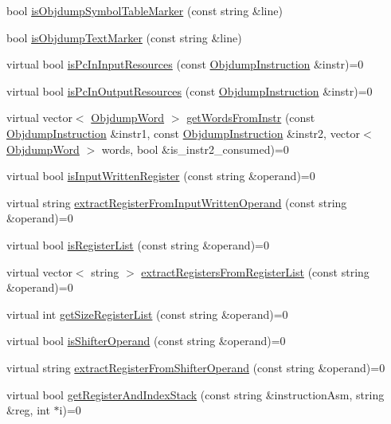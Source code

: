\begin{DoxyCompactItemize}
\item 
bool \hyperlink{classArch__dep_ae888c716d93a4d70216826f31997a0b1}{is\+Objdump\+Symbol\+Table\+Marker} (const string \&line)
\item 
bool \hyperlink{classArch__dep_ae6672e820c8f1210a9ce6cfa51432560}{is\+Objdump\+Text\+Marker} (const string \&line)
\item 
virtual bool \hyperlink{classArch__dep_ac6456dfba496bcf104d460c8610a484f}{is\+Pc\+In\+Input\+Resources} (const \hyperlink{classObjdumpInstruction}{Objdump\+Instruction} \&instr)=0
\item 
virtual bool \hyperlink{classArch__dep_a89b89f3e5248442dda296986f5673bb6}{is\+Pc\+In\+Output\+Resources} (const \hyperlink{classObjdumpInstruction}{Objdump\+Instruction} \&instr)=0
\item 
virtual vector$<$ \hyperlink{classObjdumpWord}{Objdump\+Word} $>$ \hyperlink{classArch__dep_a00e2fabd6cc0f5b9c36593a67f793d7a}{get\+Words\+From\+Instr} (const \hyperlink{classObjdumpInstruction}{Objdump\+Instruction} \&instr1, const \hyperlink{classObjdumpInstruction}{Objdump\+Instruction} \&instr2, vector$<$ \hyperlink{classObjdumpWord}{Objdump\+Word} $>$ words, bool \&is\+\_\+instr2\+\_\+consumed)=0
\item 
virtual bool \hyperlink{classArch__dep_a3d926dc01afb4aebf1136dbe0962a30d}{is\+Input\+Written\+Register} (const string \&operand)=0
\item 
virtual string \hyperlink{classArch__dep_a286da739265c852e98f2efd622615b96}{extract\+Register\+From\+Input\+Written\+Operand} (const string \&operand)=0
\item 
virtual bool \hyperlink{classArch__dep_a6c37096e67b2c02e9c0bd38313245979}{is\+Register\+List} (const string \&operand)=0
\item 
virtual vector$<$ string $>$ \hyperlink{classArch__dep_afac73b40e179fbab3fc0954aa060548f}{extract\+Registers\+From\+Register\+List} (const string \&operand)=0
\item 
virtual int \hyperlink{classArch__dep_aff5899fb3e5793bf07f43512bfcc04e1}{get\+Size\+Register\+List} (const string \&operand)=0
\item 
virtual bool \hyperlink{classArch__dep_ad56e95263903d54aabbb91efdcf7eba4}{is\+Shifter\+Operand} (const string \&operand)=0
\item 
virtual string \hyperlink{classArch__dep_a58002697a2ce55ff09eee606807cfab3}{extract\+Register\+From\+Shifter\+Operand} (const string \&operand)=0
\item 
virtual bool \hyperlink{classArch__dep_a449f2174ec019b4526e1904716d7bae1}{get\+Register\+And\+Index\+Stack} (const string \&instruction\+Asm, string \&reg, int $\ast$i)=0

\end{DoxyCompactItemize}
